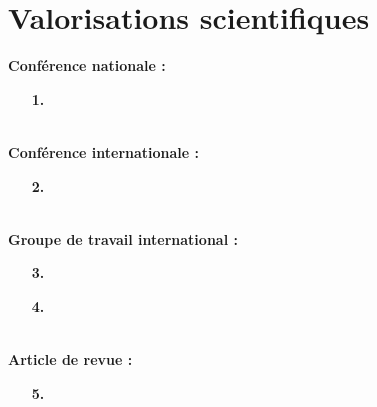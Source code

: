 \chapter*{Valorisations scientifiques}
\mtcaddchapter 

\textbf{Conférence nationale :} ~\\
\vspace{-0.2cm}
\begin{itemize}
\item[\textbf{1.} ] 
\end{itemize}
~\\
\textbf{Conférence internationale :} ~\\
\vspace{-0.2cm}
\begin{itemize}
\item[\textbf{2.}  ] 
\end{itemize}
~\\
\textbf{Groupe de travail international :} ~\\
\vspace{-0.2cm}
\begin{itemize}
\item[\textbf{3.}  ] 
\item[\textbf{4.}  ] 
\end{itemize}
~\\
\textbf{Article de revue :} ~\\
\vspace{-0.1cm}
\begin{itemize}
\item[\textbf{5.}  ] 
\end{itemize}